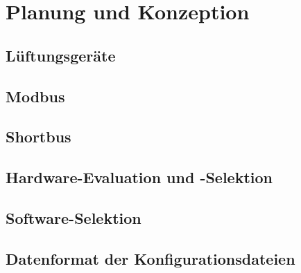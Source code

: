 \ifoot{\fenkart}
\chapter{Planung und Konzeption}
\section{Lüftungsgeräte}


\newpage
\ifoot{\schneider}
\section{Modbus}


\newpage
\ifoot{\fenkart}
\section{Shortbus}


\newpage
\ifoot{\mangeng}
\section{Hardware-Evaluation und -Selektion}



\newpage
\ifoot{\schneider}
\section{Software-Selektion}



\newpage
\ifoot{\pezze}


\newpage
\ifoot{\pezze}
\section{Datenformat der Konfigurationsdateien}

